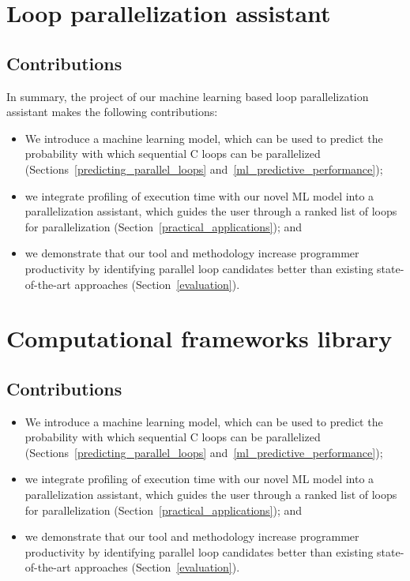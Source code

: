 \section{Loop parallelization assistant}
\label{introduction_assistant}
\subsection{Contributions}
\quad In summary, the project of our machine learning based loop parallelization assistant makes the following contributions:
%
\begin{itemize}
\renewcommand\labelitemi{$\vartriangleright$}
\renewcommand\labelitemii{$\bullet$}
\item We introduce a machine learning model, which can be used to predict the probability with which sequential C loops can be parallelized (Sections~\ref{predicting_parallel_loops} and~\ref{ml_predictive_performance});
\item we integrate profiling of execution time with our novel ML model into a parallelization assistant, which guides the user through a ranked list of loops for parallelization (Section~\ref{practical_applications}); and
\item we demonstrate that our tool and methodology increase programmer productivity by identifying parallel loop candidates better than existing state-of-the-art approaches (Section~\ref{evaluation}).
\end{itemize}





\section{Computational frameworks library}



\label{introduction_frameworks}



\subsection{Contributions}
\begin{itemize}
\renewcommand\labelitemi{$\vartriangleright$}
\renewcommand\labelitemii{$\bullet$}
\item We introduce a machine learning model, which can be used to predict the probability with which sequential C loops can be parallelized (Sections~\ref{predicting_parallel_loops} and~\ref{ml_predictive_performance});
\item we integrate profiling of execution time with our novel ML model into a parallelization assistant, which guides the user through a ranked list of loops for parallelization (Section~\ref{practical_applications}); and
\item we demonstrate that our tool and methodology increase programmer productivity by identifying parallel loop candidates better than existing state-of-the-art approaches (Section~\ref{evaluation}).
\end{itemize}

